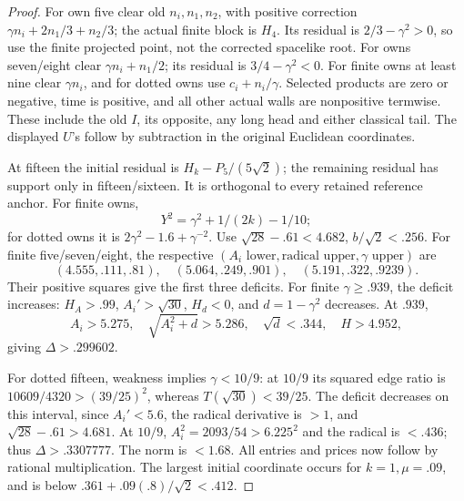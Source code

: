 \begin{proof}
For own five clear old \(n_i,n_1,n_2\), with positive correction
\(\gamma n_i+2n_1/3+n_2/3\); the actual finite block is \(H_4\).
Its residual is \(2/3-\gamma^2>0\), so use the finite projected
point, not the corrected spacelike root. For owns seven/eight clear
\(\gamma n_i+n_1/2\); its residual is \(3/4-\gamma^2<0\).
For finite owns at least nine clear \(\gamma n_i\), and for dotted
owns use \(c_i+n_i/\gamma\). Selected products are zero or negative,
time is positive, and all other actual walls are nonpositive termwise.
These include the old \(I\), its opposite, any long head and either
classical tail. The displayed \(U\)'s follow by subtraction in the
original Euclidean coordinates.

At fifteen the initial residual is
\(H_k-P_5/(5\sqrt2)\); the remaining residual has support only in
fifteen/sixteen. It is orthogonal to every retained reference anchor.
For finite owns,
\[
 Y^2=\gamma^2+1/(2k)-1/10;
\]
for dotted owns it is \(2\gamma^2-1.6+\gamma^{-2}\).
Use \(\sqrt{28}-.61<4.682\), \(b/\sqrt2<.256\).
For finite five/seven/eight, the respective
\((A_i\text{ lower},\text{radical upper},\gamma\text{ upper})\)
are
\[
 (4.555,.111,.81),\quad(5.064,.249,.901),\quad
 (5.191,.322,.9239).
\]
Their positive squares give the first three deficits.
For finite \(\gamma\ge.939\), the deficit increases:
\(H_A>.99\), \(A_i'>\sqrt{30}\), \(H_d<0\), and
\(d=1-\gamma^2\) decreases. At \(.939\),
\[
 A_i>5.275,\quad\sqrt{A_i^2+d}>5.286,\quad\sqrt d<.344,
 \quad H>4.952,
\]
giving \(\Delta>.299602\).

For dotted fifteen, weakness implies \(\gamma<10/9\):
at \(10/9\) its squared edge ratio is
\(10609/4320>(39/25)^2\), whereas \(T(\sqrt{30})<39/25\).
The deficit decreases on this interval, since
\(A_i'<5.6\), the radical derivative is \(>1\), and
\(\sqrt{28}-.61>4.681\). At \(10/9\),
\(A_i^2=2093/54>6.225^2\) and the radical is \(<.436\);
thus \(\Delta>.3307777\). The norm is \(<1.68\).
All entries and prices now follow by rational multiplication.
The largest initial coordinate occurs for \(k=1,\mu=.09\),
and is below \(.361+.09(.8)/\sqrt2<.412\).
\end{proof}

